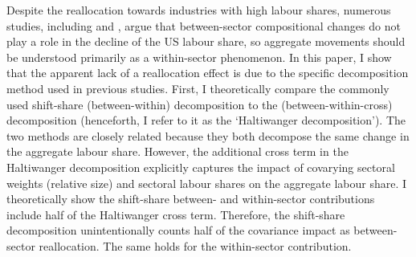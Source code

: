 Despite the reallocation towards industries with high labour shares, numerous studies, including \citet{daoWhyLabourReceiving2019a, elsbyDeclineLaborShare2013a} and \citet{karabarbounisGlobalDeclineLabor2014a}, argue that between-sector compositional changes do not play a role in the decline of the US labour share, so aggregate movements should be understood primarily as a within-sector phenomenon. In this paper, I show that the apparent lack of a reallocation effect is due to the specific decomposition method used in previous studies. First, I theoretically compare the commonly used shift-share (between-within) decomposition to the \citet{haltiwangerMeasuringAnalyzingAggregate1997} (between-within-cross) decomposition (henceforth, I refer to it as the `Haltiwanger decomposition'). The two methods are closely related because they both decompose the same change in the aggregate labour share. However, the additional cross term in the Haltiwanger decomposition explicitly captures the impact of covarying sectoral weights (relative size) and sectoral labour shares on the aggregate labour share. I theoretically show the shift-share between- and within-sector contributions include half of the Haltiwanger cross term. Therefore, the shift-share decomposition unintentionally counts half of the covariance impact as between-sector reallocation. The same holds for the within-sector contribution. 




